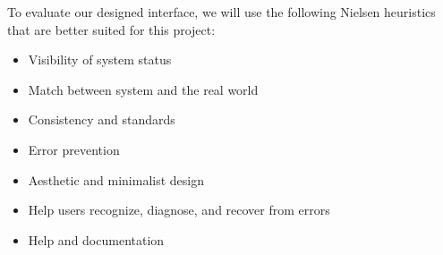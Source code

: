 \documentclass{article}
\begin{document}
To evaluate our designed interface, we will use the following Nielsen heuristics that are better suited for this project:
\begin{itemize}[itemsep=1pt, parsep=1pt]
    \item Visibility of system status
    \item Match between system and the real world
    \item Consistency and standards
    \item Error prevention
    \item Aesthetic and minimalist design
    \item Help users recognize, diagnose, and recover from errors
    \item Help and documentation
\end{itemize}
\end{document}
